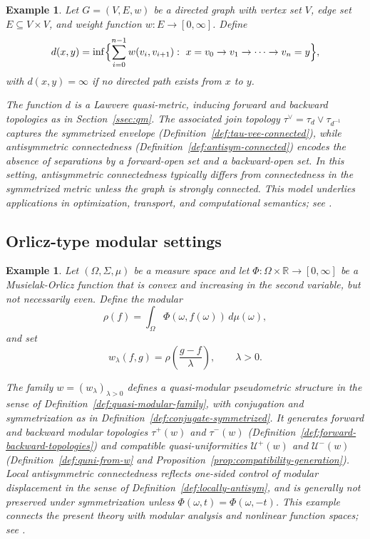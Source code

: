 \documentclass[preprint,12pt]{elsarticle}
\newtheorem{example}[theorem]{Example}
\begin{document}
\begin{example}
\label{ex:lawvere-graph}
Let $G=(V,E,w)$ be a directed graph with vertex set $V$, edge set
$E\subseteq V\times V$, and weight function
$w:E\to[0,\infty]$. Define
\[
d(x,y)
=
\inf\Bigl\{\sum_{i=0}^{n-1} w(v_i,v_{i+1})
:\ x=v_0\to v_1\to\cdots\to v_n=y\Bigr\},
\]
with $d(x,y)=\infty$ if no directed path exists from $x$ to $y$.

The function $d$ is a Lawvere quasi-metric, inducing forward and backward
topologies as in Section~\ref{ssec:qm}. The associated join topology
$\tau^\vee=\tau_d\vee\tau_{d^{-1}}$ captures the symmetrized envelope
(Definition~\ref{def:tau-vee-connected}), while antisymmetric
connectedness (Definition~\ref{def:antisym-connected}) encodes the
absence of separations by a forward-open set and a backward-open set.
In this setting, antisymmetric connectedness typically differs from
connectedness in the symmetrized metric unless the graph is strongly
connected. This model underlies applications in optimization, transport,
and computational semantics; see \cite{Lawvere1973}.
\end{example}


\subsection{Orlicz-type modular settings}\label{ssec:ex-orlicz}

\begin{example}
\label{ex:orlicz}
Let $(\Omega,\Sigma,\mu)$ be a measure space and let
$\Phi:\Omega\times\mathbb{R}\to[0,\infty]$ be a Musielak-Orlicz function
that is convex and increasing in the second variable, but not
necessarily even. Define the modular
\[
\rho(f)
=
\int_{\Omega}\Phi(\omega,f(\omega))\,d\mu(\omega),
\]
and set
\[
w_{\lambda}(f,g)
=
\rho\!\left(\frac{g-f}{\lambda}\right),
\qquad \lambda>0.
\]

The family $w=(w_\lambda)_{\lambda>0}$ defines a quasi-modular
pseudometric structure in the sense of
Definition~\ref{def:quasi-modular-family}, with conjugation and
symmetrization as in Definition~\ref{def:conjugate-symmetrized}. It
generates forward and backward modular topologies $\tau^{+}(w)$ and
$\tau^{-}(w)$ (Definition~\ref{def:forward-backward-topologies}) and
compatible quasi-uniformities $\mathcal U^{+}(w)$ and $\mathcal U^{-}(w)$
(Definition~\ref{def:quni-from-w} and
Proposition~\ref{prop:compatibility-generation}). Local antisymmetric
connectedness reflects one-sided control of modular displacement in the
sense of Definition~\ref{def:locally-antisym}, and is generally not
preserved under symmetrization unless $\Phi(\omega,t)=\Phi(\omega,-t)$.
This example connects the present theory with modular analysis and
nonlinear function spaces; see
\cite{Chistyakov2015,Majozi2025,Musielak1983}.
\end{example}
\end{document}
